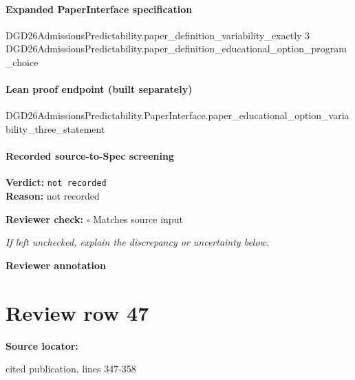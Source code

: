 \documentclass[10pt]{article}
\newcommand{\reviewerbox}{%
  \par\noindent\fbox{\parbox{0.96\linewidth}{\rule{0pt}{0.38in}}}\par
}
\newcommand{\reviewmatch}[1]{%
  \par\noindent\textbf{Reviewer check:} $\square$\; #1\par
  \noindent\emph{If left unchecked, explain the discrepancy or uncertainty below.}\par
}
\begin{document}
\paragraph{Expanded PaperInterface specification}
\begin{ReviewVerbatim}
DGD26AdmissionsPredictability.paper_definition_variability_exactly 3
  DGD26AdmissionsPredictability.paper_definition_educational_option_program_choice
\end{ReviewVerbatim}

\paragraph{Lean proof endpoint (built separately)}\begin{ReviewVerbatim}
DGD26AdmissionsPredictability.PaperInterface.paper_educational_option_variability_three_statement
\end{ReviewVerbatim}

\paragraph{Recorded source-to-Spec screening}
\textbf{Verdict:} \texttt{not recorded}
\\
\textbf{Reason:} not recorded
\reviewmatch{Matches source input}
\noindent\textbf{Reviewer annotation}\par
\reviewerbox
\clearpage
\hypertarget{source-claim-a241fbe5321a55d3}{}
\section*{Review row 47}
\textbf{Source locator:} {\footnotesize\raggedright cited publication, lines 347-\allowbreak{}358\par}
\end{document}
